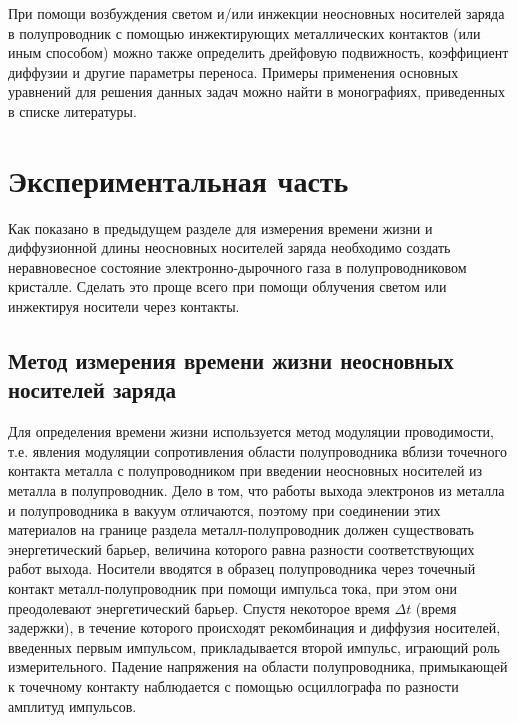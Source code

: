 \documentclass[a4paper,12pt]{article}
\begin{document}
При помощи возбуждения светом и/или инжекции неосновных носителей заряда в полупроводник с помощью инжектирующих металлических контактов (или иным способом) можно также определить дрейфовую подвижность, коэффициент диффузии и другие параметры переноса. Примеры применения основных уравнений для решения данных задач можно найти в монографиях, приведенных в списке литературы.


\section{Экспериментальная часть}
Как показано в предыдущем разделе для измерения времени жизни и диффузионной длины неосновных носителей заряда необходимо создать неравновесное состояние электронно-дырочного газа в полупроводниковом кристалле. Сделать это проще всего при помощи облучения светом или инжектируя носители через контакты.

\subsection{Метод измерения времени жизни неосновных носителей заряда}

Для определения времени жизни используется метод модуляции проводимости, т.е. явления модуляции сопротивления области полупроводника вблизи точечного контакта металла с полупроводником при введении неосновных носителей из металла в полупроводник. Дело в том, что работы выхода электронов из металла и полупроводника в вакуум отличаются, поэтому при соединении этих материалов на границе раздела металл-полупроводник должен существовать энергетический барьер, величина которого равна разности соответствующих работ выхода. Носители вводятся в образец полупроводника через точечный контакт металл-полупроводник при помощи импульса тока, при этом они преодолевают энергетический барьер. Спустя некоторое время $\Delta t$ (время задержки), в течение которого происходят рекомбинация и диффузия носителей, введенных первым импульсом, прикладывается второй импульс, играющий роль измерительного. Падение напряжения на области полупроводника, примыкающей к точечному контакту наблюдается с помощью осциллографа по разности амплитуд импульсов.
\end{document}
